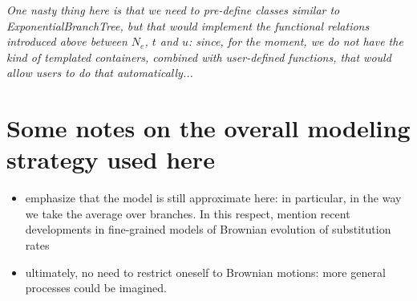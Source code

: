 \documentclass[11pt, oneside]{article}   	%
\begin{document}
\emph{One nasty thing here is that we need to pre-define classes similar to ExponentialBranchTree, but that would implement the functional relations introduced above between $N_e$, $t$ and $u$: since, for the moment, we do not have the kind of templated containers, combined with user-defined functions, that would allow users to do that automatically...}

\section{Some notes on the overall modeling strategy used here}

\begin{itemize}
\item
emphasize that the model is still approximate here: in particular, in the way we take the average over branches. In this respect, mention recent developments in fine-grained models of Brownian evolution of substitution rates
\item
ultimately, no need to restrict oneself to Brownian motions: more general processes could be imagined.
\end{itemize}




\end{document}
